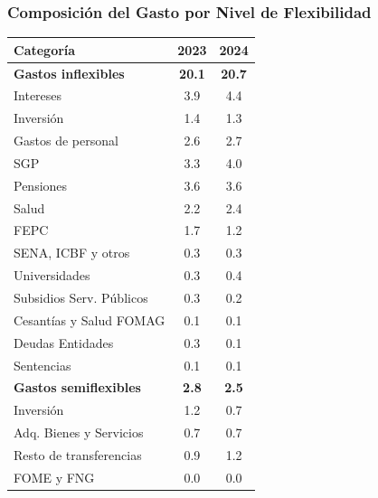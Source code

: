 \begin{frame}[fragile]
  \frametitle{Composición del Gasto por Nivel de Flexibilidad}

  \begin{table}[h!]
  \centering
  \scriptsize
  \begin{tabular}{@{}lcc@{}}
  \toprule
  \textbf{Categoría} & \textbf{2023} & \textbf{2024} \\
  \midrule
  \textbf{Gastos inflexibles}        & \textbf{20.1} & \textbf{20.7} \\
  \quad Intereses                    & 3.9  & 4.4  \\
  \quad Inversión                    & 1.4  & 1.3  \\
  \quad Gastos de personal           & 2.6  & 2.7  \\
  \quad SGP                          & 3.3  & 4.0  \\
  \quad Pensiones                    & 3.6  & 3.6  \\
  \quad Salud                        & 2.2  & 2.4  \\
  \quad FEPC                         & 1.7  & 1.2  \\
  \quad SENA, ICBF y otros           & 0.3  & 0.3  \\
  \quad Universidades                & 0.3  & 0.4  \\
  \quad Subsidios Serv. Públicos     & 0.3  & 0.2  \\
  \quad Cesantías y Salud FOMAG      & 0.1  & 0.1  \\
  \quad Deudas Entidades             & 0.3  & 0.1  \\
  \quad Sentencias                   & 0.1  & 0.1  \\
  \midrule
  \textbf{Gastos semiflexibles}      & \textbf{2.8}  & \textbf{2.5}  \\
  \quad Inversión                    & 1.2  & 0.7  \\
  \quad Adq. Bienes y Servicios      & 0.7  & 0.7  \\
  \quad Resto de transferencias      & 0.9  & 1.2  \\
  \quad FOME y FNG                   & 0.0  & 0.0  \\
  \bottomrule
  \end{tabular}
  \end{table}
\end{frame}
